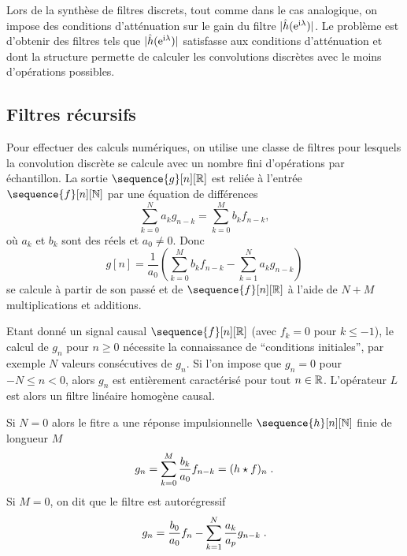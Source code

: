 Lors de la synth\`ese de filtres discrets, tout comme dans le
cas analogique, on impose des conditions
d'att\'enuation sur le gain du filtre $|\hat h ({\mathrm{e}^{\mathrm{i} \lambda}})|$.
Le probl\`eme est d'obtenir des filtres tels
que $|\hat h ({\mathrm{e}^{\mathrm{i} \lambda}})|$ satisfasse aux conditions d'att\'enuation et
dont la structure permette de calculer les convolutions discr\`etes
avec le moins d'op\'erations possibles.

\subsection{Filtres r\'ecursifs}
\label{recursifs}
Pour effectuer des calculs num\'eriques, on utilise
une classe de filtres pour lesquels la convolution discr\`ete
se calcule avec un nombre fini d'op\'erations par
\'echantillon.
La sortie $\sequence{g}[n][\zset]$ est reliée à l'entrée $\sequence{f}[n][\nset]$
par une \'equation de diff\'erences
\begin{equation}
\label{recurr}
\sum_{k=0}^N a_k g_{n-k} = \sum_{k=0}^M b_k f_{n-k} ,
\end{equation}
o\`u $a_k$ et $b_k$ sont des r\'eels et $a_0 \neq 0$.
Donc
\[
g[n] = \frac 1 {a_0} \left(
\sum_{k=0}^M b_k f_{n-k} - \sum_{k=1}^N a_k g_{n-k} \right)
\]
se calcule \`a partir de son pass\'e et de $\sequence{f}[n][\zset]$ \`a l'aide de
$N+M$ multiplications et additions.

Etant donn\'e un signal causal $\sequence{f}[n][\zset]$ (avec $f_k=0$ pour $k \leq -1$), 
le calcul de $g_n$ pour $n \geq 0$ n\'ecessite la connaissance de ``conditions initiales'',
par exemple $N$ valeurs cons\'ecutives de $g_n$.
Si l'on impose que $g_n = 0$ pour $-N \leq n < 0$, alors
$g_n$ est enti\`erement caract\'eris\'e pour tout $n \in \mathbb{R}$.
L'op\'erateur $L$ est alors un filtre lin\'eaire homog\`ene causal.

Si $N = 0$ alors le fitre a une r\'eponse impulsionnelle $\sequence{h}[n][\nset]$ finie
de longueur $M$
\[
g_n =
\sum_{k=0}^M \frac {b_k} {a_0} f_{n-k} = (h \star f)_n \;.
\]
Si $M = 0$, on dit que le filtre est autor\'egressif
\[
g_n = \frac {b_0} {a_0} f_n - \sum_{k=1}^N \frac{a_k} {a_p} g_{n-k} \;.
\]
